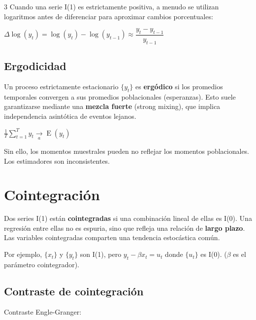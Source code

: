 \documentclass[10pt, a4paper, landscape]{article}
\DeclareMathOperator{\E}{E}
\begin{document}
\begin{multicols}{3}
\vspace*{0.1cm}
Cuando una serie I(1) es estrictamente positiva, a menudo se utilizan logaritmos antes de diferenciar para aproximar cambios porcentuales:

\begin{center}
	\( \Delta \log(y_{t}) = \log(y_{t}) - \log(y_{t - 1}) \approx \dfrac{y_t - y_{t - 1}} {y_{t - 1}} \)
\end{center}

\columnbreak

\subsection*{Ergodicidad}

Un proceso estrictamente estacionario \( \{ y_{t} \} \) es \textbf{ergódico} si los promedios temporales convergen a sus promedios poblacionales (esperanzas). Esto suele garantizarse mediante una \textbf{mezcla fuerte} (strong mixing), que implica independencia asintótica de eventos lejanos.

\begin{center}
	\( \frac{1}{T} \sum_{t = 1}^{T} y_{t} \underset{a}{\rightarrow} \E(y_{t}) \)
\end{center}

Sin ello, los momentos muestrales pueden no reflejar los momentos poblacionales. Los estimadores son inconsistentes.

\section*{Cointegración}

Dos series I(1) están \textbf{cointegradas} si una combinación lineal de ellas es I(0). Una regresión entre ellas no es espuria, sino que refleja una relación de \textbf{largo plazo}. Las variables cointegradas comparten una tendencia estocástica común.

Por ejemplo, \( \{ x_{t} \} \) y \( \{ y_{t} \} \) son I(1), pero \( y_{t} - \beta x_{t} = u_{t} \) donde \( \{ u_{t} \} \) es I(0). (\( \beta \) es el parámetro cointegrador).

\subsection*{Contraste de cointegración}

Contraste Engle-Granger:


\end{multicols}
\end{document}

